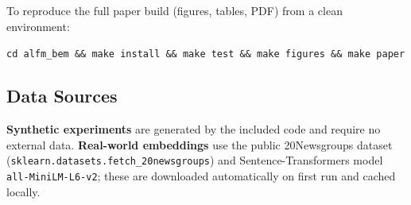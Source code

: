 \documentclass[11pt]{article}
\begin{document}
To reproduce the full paper build (figures, tables, PDF) from a clean environment:
\begin{center}
\texttt{cd alfm\_bem \&\& make install \&\& make test \&\& make figures \&\& make paper}
\end{center}

\subsection*{Data Sources}

\textbf{Synthetic experiments} are generated by the included code and require no external data. \textbf{Real-world embeddings} use the public 20Newsgroups dataset (\texttt{sklearn.datasets.fetch\_20newsgroups}) and Sentence-Transformers model \texttt{all-MiniLM-L6-v2}; these are downloaded automatically on first run and cached locally.
\end{document}
